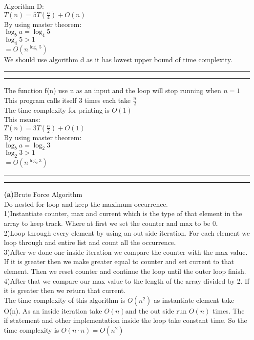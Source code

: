 \documentclass[a4paper, 11pt]{article}
\newcommand{\question}[2] {\vspace{.25in} \hrule\vspace{0.5em}
\noindent{\bf #1: #2} \vspace{0.5em}
\hrule \vspace{.10in}}
\renewcommand{\part}[1] {\vspace{.10in} {\bf (#1)}}
\begin{document}
Algorithm D:\\
$T(n)=5T(\frac{n}{4})+O(n)$\\
By using master theorem:\\
$\log_{b} a = \log_{4} 5$\\
$\log_{4} 5 > 1$\\
$=O(n^{\log_{4} 5})$\\
We should use algorithm d as it has lowest upper bound of time complexity.
\question{3}{Problem3}
The function f(n) use n as an input and the loop will stop running when $n=1$\\
This program calls itself 3 times each take $\frac{n}{2}$\\
The time complexity for printing is $O(1)$\\
This means:\\
$T(n)=3T(\frac{n}{2})+O(1)$\\
By using master theorem:\\
$\log_{b} a = \log_2 3$\\
$\log_2 3 > 1$\\
$=O(n^{\log_{2} 3})$

\question{4}{Problem4}
\part{a}{Brute Force Algorithm}\\
Do nested for loop and keep the maximum occurrence.\\ 
1)Instantiate counter, max and current which is the type of that element in the array to keep track. Where at first we set the counter and max to be 0.\\ 
2)Loop through every element by using an out side iteration. For each element we loop through and entire list and count all the occurrence.\\
3)After we done one inside iteration we compare the counter with the max value. If it is greater then we make greater equal to counter and set current to that element. Then we reset counter and continue the loop until the outer loop finish.\\
4)After that we compare our max value to the length of the array divided by 2. If it is greater then we return that current.\\
The time complexity of this algorithm is $O(n^{2})$ as instantiate element take O(n). As an inside iteration take $O(n)$and the out side run $O(n)$ times. The if statement and other implementation inside the loop take constant time. So the time complexity is $O(n \cdot n) = O(n^{2})$
\end{document}
